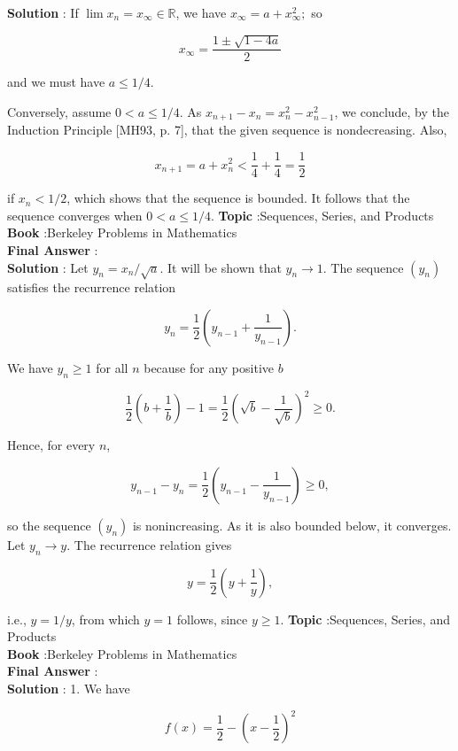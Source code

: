 \documentclass[10pt]{article}
\begin{document}
\textbf{Solution} : If $\lim x_{n}=x_{\infty} \in \mathbb{R}$, we have $x_{\infty}=a+x_{\infty}^{2} ;$ so

$$
x_{\infty}=\frac{1 \pm \sqrt{1-4 a}}{2}
$$

and we must have $a \leqslant 1 / 4$.

Conversely, assume $0<a \leqslant 1 / 4$. As $x_{n+1}-x_{n}=x_{n}^{2}-x_{n-1}^{2}$, we conclude, by the Induction Principle [MH93, p. 7], that the given sequence is nondecreasing. Also,

$$
x_{n+1}=a+x_{n}^{2}<\frac{1}{4}+\frac{1}{4}=\frac{1}{2}
$$

if $x_{n}<1 / 2$, which shows that the sequence is bounded. It follows that the sequence converges when $0<a \leqslant 1 / 4$.
\textbf{Topic} :Sequences, Series, and Products \\
\textbf{Book} :Berkeley Problems in Mathematics\\
\textbf{Final Answer} :\\


\textbf{Solution} : Let $y_{n}=x_{n} / \sqrt{a}$. It will be shown that $y_{n} \rightarrow 1$. The sequence $\left(y_{n}\right)$ satisfies the recurrence relation

$$
y_{n}=\frac{1}{2}\left(y_{n-1}+\frac{1}{y_{n-1}}\right) .
$$

We have $y_{n} \geqslant 1$ for all $n$ because for any positive $b$

$$
\frac{1}{2}\left(b+\frac{1}{b}\right)-1=\frac{1}{2}\left(\sqrt{b}-\frac{1}{\sqrt{b}}\right)^{2} \geqslant 0 .
$$

Hence, for every $n$,

$$
y_{n-1}-y_{n}=\frac{1}{2}\left(y_{n-1}-\frac{1}{y_{n-1}}\right) \geqslant 0,
$$

so the sequence $\left(y_{n}\right)$ is nonincreasing. As it is also bounded below, it converges. Let $y_{n} \rightarrow y$. The recurrence relation gives

$$
y=\frac{1}{2}\left(y+\frac{1}{y}\right),
$$

i.e., $y=1 / y$, from which $y=1$ follows, since $y \geqslant 1$.
\textbf{Topic} :Sequences, Series, and Products \\
\textbf{Book} :Berkeley Problems in Mathematics\\
\textbf{Final Answer} :\\


\textbf{Solution} : 1. We have

$$
f(x)=\frac{1}{2}-\left(x-\frac{1}{2}\right)^{2}
$$
\end{document}
